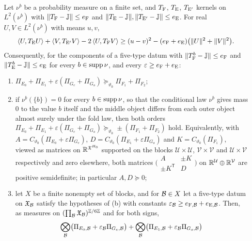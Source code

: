 \begin{lemma}[Polarization]\label{lem:tr:polarization}
Let $\nu^b$ be a probability measure on a finite set, and $T_{\rm F}$,
$T_{\rm E}$, $T_{\rm E'}$ kernels on $L^2(\nu^b)$ with
$\|T_{\rm F}-\mathbb J\|\le e_{\rm F}$ and
$\|T_{\rm E}-\mathbb J\|,\|T_{\rm E'}-\mathbb J\|\le e_{\rm E}$. For real $U,V\in L^2(\nu^b)$
with means $u,v$,
\begin{equation}\label{eq:polarization}
 \left\langle U,T_{\rm E}U\right\rangle+\left\langle V,T_{\rm E'}V\right\rangle-2\left\langle U,T_{\rm F}V\right\rangle\ge(u-v)^2
 -(e_{\rm F}+e_{\rm E})\bigl(\|U\|^2+\|V\|^2\bigr).
\end{equation}
Consequently, for the components of a five-type datum with
$\|T_{\rm F}^b-\mathbb J\|\le e_{\rm F}$ and $\|T_{\rm E}^b-\mathbb J\|\le e_{\rm E}$ for
every $b\in\operatorname{supp}\nu$, and every $\varepsilon\ge e_{\rm F}+e_{\rm E}$:
\begin{enumerate}[label=\textup{(\alph*)}]
\item $\Pi_{E_0}+\Pi_{E_1}+\varepsilon(\Pi_{G_e}+\Pi_{G_o})
 \succeq_{\vartheta_0}\Pi_{F_1}+\Pi_{F_2}$;
\item if $\nu^b(\{b\})=0$ for every $b\in\operatorname{supp}\nu$, so that the
 conditional law $\nu^b$ gives mass $0$ to the value $b$ itself and the
  middle object differs from each outer object almost surely under the
  fold law, then both orders
 $\Pi_{E_0}+\Pi_{E_1}+\varepsilon(\Pi_{G_e}+\Pi_{G_o})
 \succeq_{\vartheta_0}\pm(\Pi_{F_1}+\Pi_{F_2})$ hold. Equivalently, with $A=C_{\vartheta_0}(\Pi_{E_0}+\varepsilon\Pi_{G_e})$,
 $D=C_{\vartheta_0}(\Pi_{E_1}+\varepsilon\Pi_{G_o})$ and
 $K=C_{\vartheta_0}(\Pi_{F_1})$, viewed as matrices on
 $\mathbb R^{\mathfrak X^{H_0}}$ supported on the blocks
 $\mathcal U\times\mathcal U$, $\mathcal V\times\mathcal V$ and
 $\mathcal U\times\mathcal V$ respectively and zero elsewhere, both
 matrices
 $\bigl(\begin{smallmatrix}A&\pm K\\ \pm K^{\mathsf T}&D\end{smallmatrix}\bigr)$ on
 $\mathbb R^{\mathcal U}\oplus\mathbb R^{\mathcal V}$ are positive semidefinite; in
 particular $A,D\succeq0$;
\item let $X$ be a finite nonempty set of blocks, and for $\mathcal B\in X$ let a
 five-type datum on $\mathfrak X_{\mathcal B}$ satisfy the hypotheses of (b) with
 constants $\varepsilon_{\mathcal B}\ge e_{{\rm F},\mathcal B}+e_{{\rm E},\mathcal B}$. Then, as
 measures on $(\prod_{\mathcal B}\mathfrak X_{\mathcal B})^{\mathbb Z/6\mathbb Z}$ and for both signs,
 \[
  \bigotimes_{\mathcal B}\bigl(\Pi_{E_0,\mathcal B}+\varepsilon_{\mathcal B}\Pi_{G_e,\mathcal B}\bigr)
  +\bigotimes_{\mathcal B}\bigl(\Pi_{E_1,\mathcal B}+\varepsilon_{\mathcal B}\Pi_{G_o,\mathcal B}\bigr)
\]
\end{enumerate}
\end{lemma}
